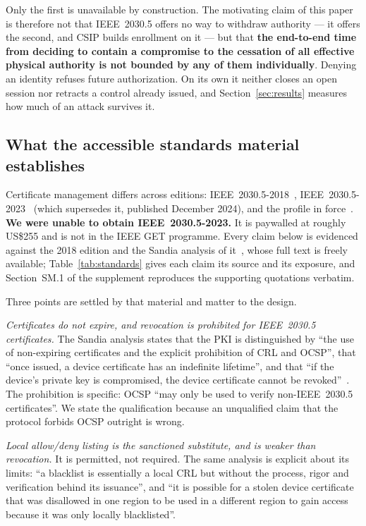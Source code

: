 Only the first is unavailable by construction. The motivating claim of this paper is therefore not
that IEEE~2030.5 offers no way to withdraw authority --- it offers the second, and CSIP builds
enrollment on it --- but that \textbf{the end-to-end time from deciding to contain a compromise to
the cessation of all effective physical authority is not bounded by any of them individually}.
Denying an identity refuses future authorization. On its own it neither closes an open session nor
retracts a control already issued, and Section~\ref{sec:results} measures how much of an attack
survives it.

\subsection{What the accessible standards material establishes}
Certificate management differs across editions: IEEE~2030.5-2018~\cite{ieee20305-2018},
IEEE~2030.5-2023~\cite{ieee20305-2023} (which supersedes it, published December 2024), and the
profile in force~\cite{sunspec2018csip}. \textbf{We were unable to obtain IEEE~2030.5-2023.} It is
paywalled at roughly US\$255 and is not in the IEEE GET programme. Every claim below is evidenced
against the 2018 edition and the Sandia analysis of it~\cite{obert2019recommendations}, whose full
text is freely available; Table~\ref{tab:standards} gives each claim its source and its exposure,
and Section~SM.1 of the supplement reproduces the supporting quotations verbatim.

Three points are settled by that material and matter to the design.

\emph{Certificates do not expire, and revocation is prohibited for IEEE~2030.5 certificates.} The
Sandia analysis states that the PKI is distinguished by ``the use of non-expiring certificates and
the explicit prohibition of CRL and OCSP'', that ``once issued, a device certificate has an
indefinite lifetime'', and that ``if the device's private key is compromised, the device
certificate cannot be revoked''~\cite{obert2019recommendations}. The prohibition is specific:
OCSP ``may only be used to verify non-IEEE~2030.5 certificates''. We state the qualification
because an unqualified claim that the protocol forbids OCSP outright is wrong.

\emph{Local allow/deny listing is the sanctioned substitute, and is weaker than revocation.} It is
permitted, not required. The same analysis is explicit about its limits: ``a blacklist is
essentially a local CRL but without the process, rigor and verification behind its issuance'', and
``it is possible for a stolen device certificate that was disallowed in one region to be used in a
different region to gain access because it was only locally blacklisted''.


